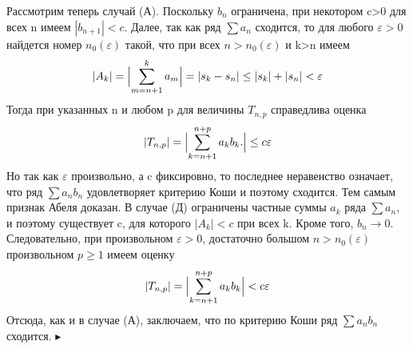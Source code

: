 \documentclass[12pt,titlepage]{report}
\begin{document}
Рассмотрим теперь случай (А). Поскольку $b_n$ ограничена, при некотором c>0 для всех n имеем $|b_{n+1}|<c$. Далее, так как ряд $\sum a_n$ сходится, то для любого $\varepsilon>0$ найдется номер $n_0(\varepsilon)$ такой, что при всех $n>n_0(\varepsilon)$ и k>n имеем
$$|A_k|=\Bigl|\sum_{m=n+1}^k a_m\Bigr|=|s_k-s_n|\le|s_k|+|s_n|<\varepsilon$$
Тогда при указанных n и любом p для величины $T_{n,p}$ справедлива оценка
$$|T_{n,p}|=\Bigl|\sum_{k=n+1}^{n+p} a_kb_k.\Bigr|\le c\varepsilon$$
Но так как $\varepsilon$ произвольно, а c фиксировно, то последнее неравенство означает, что ряд $\sum a_nb_n$ удовлетворяет критерию Коши и поэтому сходится. Тем самым признак Абеля доказан.
В случае (Д) ограничены частные суммы $a_k$ ряда $\sum a_n$, и поэтому существует c, для которого $|A_k|<c$ при всех k. Кроме того, $b_n\to 0$. Следовательно, при произвольном $\varepsilon>0$, достаточно большом $n>n_0(\varepsilon)$ произвольном $p\ge1$ имеем оценку $$|T_{n,p}|=\Bigl|\sum_{k=n+1}^{n+p}a_kb_k\Bigr|<c\varepsilon$$ Отсюда, как и в случае (А), заключаем, что по критерию Коши ряд $\sum a_nb_n$ сходится. $\blacktriangleright$
\end{document}

